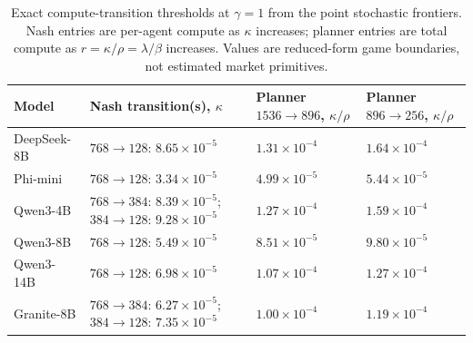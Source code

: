 \begin{table}[H]
\centering
\caption{Exact compute-transition thresholds at $\gamma=1$ from the point stochastic frontiers. Nash entries are per-agent compute as $\kappa$ increases; planner entries are total compute as $r=\kappa/\rho=\lambda/\beta$ increases. Values are reduced-form game boundaries, not estimated market primitives.}
\label{tab:normalizedthresholds}
\scriptsize
\setlength{\tabcolsep}{3.0pt}
\begin{tabular}{llll}
\toprule
Model & Nash transition(s), $\kappa$ & Planner $1536\to896$, $\kappa/\rho$ & Planner $896\to256$, $\kappa/\rho$ \\
\midrule
DeepSeek-8B & $768\to128$: $8.65\times10^{-5}$ & $1.31\times10^{-4}$ & $1.64\times10^{-4}$ \\
Phi-mini & $768\to128$: $3.34\times10^{-5}$ & $4.99\times10^{-5}$ & $5.44\times10^{-5}$ \\
Qwen3-4B & $768\to384$: $8.39\times10^{-5}$; $384\to128$: $9.28\times10^{-5}$ & $1.27\times10^{-4}$ & $1.59\times10^{-4}$ \\
Qwen3-8B & $768\to128$: $5.49\times10^{-5}$ & $8.51\times10^{-5}$ & $9.80\times10^{-5}$ \\
Qwen3-14B & $768\to128$: $6.98\times10^{-5}$ & $1.07\times10^{-4}$ & $1.27\times10^{-4}$ \\
Granite-8B & $768\to384$: $6.27\times10^{-5}$; $384\to128$: $7.35\times10^{-5}$ & $1.00\times10^{-4}$ & $1.19\times10^{-4}$ \\
\bottomrule
\end{tabular}
\end{table}
